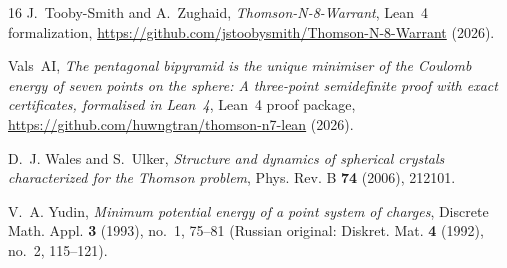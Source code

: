 \documentclass[11pt,reqno]{amsart}
\renewcommand{\_}{\origunderscore\allowbreak}
\theoremstyle{definition}
\begin{document}
\begin{thebibliography}{16}
J.~Tooby-Smith and A.~Zughaid,
\emph{Thomson-N-8-Warrant},
Lean~4 formalization, \url{https://github.com/jstoobysmith/Thomson-N-8-Warrant} (2026).

Vals~AI,
\emph{The pentagonal bipyramid is the unique minimiser of the Coulomb energy of seven points on the sphere: A three-point semidefinite proof with exact certificates, formalised in Lean~4},
Lean~4 proof package, \url{https://github.com/huwngtran/thomson-n7-lean} (2026).

D.~J. Wales and S.~Ulker,
\emph{Structure and dynamics of spherical crystals characterized for the Thomson problem},
Phys. Rev. B \textbf{74} (2006), 212101.

V.~A. Yudin,
\emph{Minimum potential energy of a point system of charges},
Discrete Math. Appl. \textbf{3} (1993), no.~1, 75--81
(Russian original: Diskret. Mat. \textbf{4} (1992), no.~2, 115--121).

\end{thebibliography}
\end{document}

